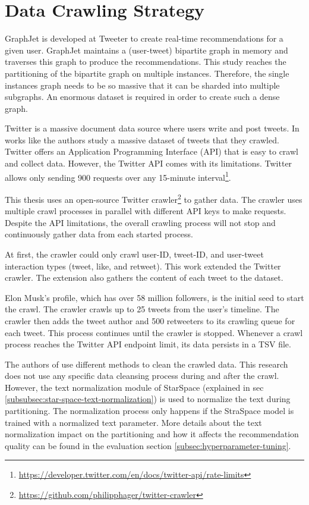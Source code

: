 \section{Data Crawling Strategy}
\label{sec:data-crawling-strategy}

GraphJet is developed at Tweeter to create real-time recommendations for a given user. GraphJet maintains a (user-tweet) bipartite graph in memory and traverses this graph to produce the recommendations. This study reaches the partitioning of the bipartite graph on multiple instances. Therefore, the single instances graph needs to be so massive that it can be sharded into multiple subgraphs. An enormous dataset is required in order to create such a dense graph.


Twitter is a massive document data source where users write and post tweets. In works like \cite{kwakWhatTwitterSocial2010} the authors study a massive dataset of tweets that they crawled. Twitter offers an Application Programming Interface (API) that is easy to crawl and collect data. However, the Twitter API comes with its limitations. Twitter allows only sending 900 requests over any 15-minute interval\footnote{\url{https://developer.twitter.com/en/docs/twitter-api/rate-limits}}. 


This thesis uses an open-source Twitter crawler\footnote{\url{https://github.com/philipphager/twitter-crawler}} to gather data. The crawler uses multiple crawl processes in parallel with different API keys to make requests. Despite the API limitations, the overall crawling process will not stop and continuously gather data from each started process.


At first, the crawler could only crawl user-ID, tweet-ID, and user-tweet interaction types (tweet, like, and retweet). This work extended the Twitter crawler. The extension also gathers the content of each tweet to the dataset. 


Elon Musk's profile, which has over 58 million followers, is the initial seed to start the crawl. The crawler crawls up to 25 tweets from the user's timeline. The crawler then adds the tweet author and 500 retweeters to its crawling queue for each tweet. This process continues until the crawler is stopped. Whenever a crawl process reaches the Twitter API endpoint limit, its data persists in a TSV file.


The authors of \cite{kwakWhatTwitterSocial2010} use different methods to clean the crawled data. This research does not use any specific data cleansing process during and after the crawl. However, the text normalization module of StarSpace (explained in sec \ref{subsubsec:star-space-text-normalization}) is used to normalize the text during partitioning. The normalization process only happens if the StraSpace model is trained with a normalized text parameter. More details about the text normalization impact on the partitioning and how it affects the recommendation quality can be found in the evaluation section \ref{subsec:hyperparameter-tuning}.


